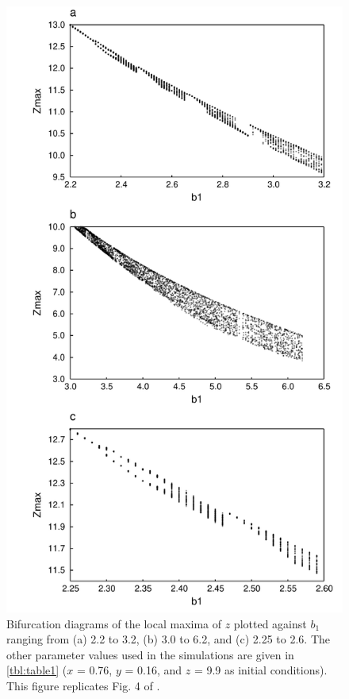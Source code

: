 \newpage

\begin{figure}
  \centering
  \includegraphics[scale=0.7]{figures/fig4.pdf}
  \caption{Bifurcation diagrams of the local maxima of $z$ plotted against $b_1$ ranging from (a) 2.2 to 3.2, (b) 3.0 to 6.2, and (c) 2.25 to 2.6. The other parameter values used in the simulations are given in \autoref{tbl:table1} ($x$ = 0.76, $y$ = 0.16, and $z$ = 9.9 as initial conditions). This figure replicates Fig. 4 of \citet{hastings1991}.}
  \label{fig:fig4}
\end{figure}

